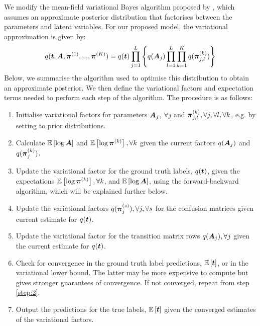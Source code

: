 We modify the mean-field variational Bayes algorithm proposed by \cite{simpsonlong}, 
which assumes an approximate posterior distribution that factorises between the parameters and 
latent variables. For our proposed model, the variational approximation is given by:
\begin{equation}
  q(\boldsymbol t, \boldsymbol A, \boldsymbol\pi^{(1)},...,\boldsymbol\pi^{(K)}) = q(\boldsymbol t)\prod_{j=1}^L \left\{ q(\boldsymbol A_j)\prod_{l=1}^L \prod_{k=1}^K  q(\boldsymbol\pi_{j,l}^{(k)}) \right\}
\end{equation}
Below, we summarise the algorithm used to optimise this distribution to obtain an approximate posterior.
We then define the variational factors and expectation terms needed to perform each step of the algorithm. The procedure is as follows:
\begin{enumerate}
 \item \label{step:1} Initialise variational factors for parameters
$\boldsymbol A_j$, $\forall j$ and
$\boldsymbol\pi_{j,l}^{(k)}, \forall j, \forall l, \forall k$, e.g. by setting to prior distributions.
 \item \label{step:2} Calculate $\mathbb{E}\left[\log \boldsymbol A \right]$ 
and $\mathbb{E}\left[\log\boldsymbol\pi^{(k)} \right], \forall k$ given the current factors 
$q(\boldsymbol A_j)$ and $q(\boldsymbol\pi_j^{(k)})$.
 \item Update the variational factor for the ground truth labels, $q(\boldsymbol t)$, given 
the expectations $\mathbb{E}\left[\log\boldsymbol\pi^{(k)} \right], \forall k$, and
$\mathbb{E}\left[\log \boldsymbol A \right]$, using the forward-backward
algorithm\cite{ghahramani2001introduction}, which will be explained further below.
 \item Update the variational factors $q(\boldsymbol\pi_j^{(s)}), \forall j, \forall s$ for the confusion matrices given current estimate for $q(\boldsymbol t)$.
 \item \label{step:4} Update the variational factor for the transition matrix rows
$q(\boldsymbol A_j), \forall j$ given the current estimate for $q(\boldsymbol t)$.
 \item \label{step:6} Check for convergence in the ground truth label predictions,
$\mathbb{E}\left[\boldsymbol t\right]$, or in the variational lower bound. 
The latter may be more expensive to compute but gives stronger guarantees of convergence. 
If not converged, repeat from step \ref{step:2}.
\item \label{step:7} Output the predictions for the true labels, $\mathbb{E}\left[\boldsymbol t\right]$ given the converged estimates of the variational factors.
\end{enumerate}

